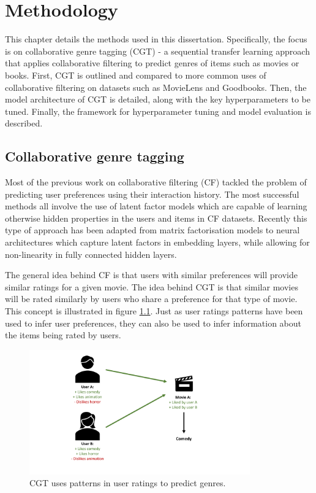 \chapter{Methodology}
This chapter details the methods used in this dissertation. Specifically, the focus is on collaborative genre tagging (CGT) - a sequential transfer learning approach that applies collaborative filtering to predict genres of items such as movies or books. First, CGT is outlined and compared to more common uses of collaborative filtering on datasets such as MovieLens and Goodbooks. Then, the model architecture of CGT is detailed, along with the key hyperparameters to be tuned. Finally, the framework for hyperparameter tuning and model evaluation is described.

\section{Collaborative genre tagging}
Most of the previous work on collaborative filtering (CF) tackled the problem of predicting user preferences using their interaction history. The most successful methods all involve the use of latent factor models which are capable of learning otherwise hidden properties in the users and items in CF datasets. Recently this type of approach has been adapted from matrix factorisation models to neural architectures which capture latent factors in embedding layers, while allowing for non-linearity in fully connected hidden layers.

The general idea behind CF is that users with similar preferences will provide similar ratings for a given movie. The idea behind CGT is that similar movies will be rated similarly by users who share a preference for that type of movie. This concept is illustrated in figure \ref{fig:4_CGT-concept}. Just as user ratings patterns have been used to infer user preferences, they can also be used to infer information about the items being rated by users.

\begin{figure}[H]
\centering
\includegraphics[width=0.85\textwidth]{Figures/4_CGT-concept.pdf}
\decoRule
\caption[Collaborative genre tagging concept]{CGT uses patterns in user ratings to predict genres.}
\label{fig:4_CGT-concept}
\end{figure}

